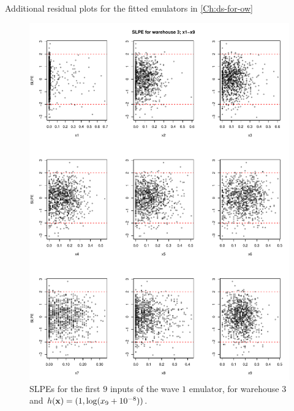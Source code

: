 \begin{chapter}{Additional residual plots  for the fitted emulators in \cref{Ch:ds-for-ow} \label{App:resid}}
\begin{figure}
  \includegraphics[width=\textwidth]{fig-app-ds/w1-w3-mean1.pdf}
  \caption{SLPEs for the first $9$ inputs of the wave $1$ emulator, for warehouse $3$ and $h(\mathbf{x}) = (1, \log (x_9 + 10^{-8}))$.}
\end{figure}


\end{chapter}
